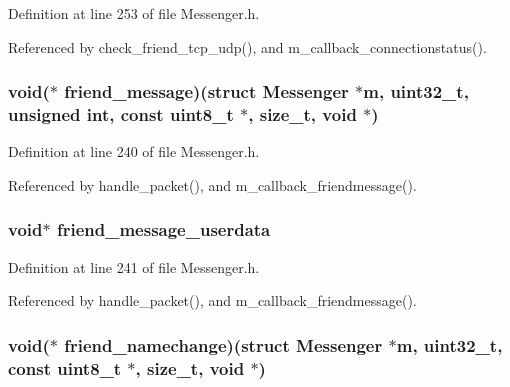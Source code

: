 Definition at line 253 of file Messenger.\+h.



Referenced by check\+\_\+friend\+\_\+tcp\+\_\+udp(), and m\+\_\+callback\+\_\+connectionstatus().

\hypertarget{struct_messenger_a85d35646398022de4e435174f990ce18}{
\subsubsection[{friend\+\_\+message}]{\setlength{\rightskip}{0pt plus 5cm}void($\ast$ friend\+\_\+message)(struct {\bf Messenger} $\ast${\bf m}, uint32\+\_\+t, unsigned int, const uint8\+\_\+t $\ast$, size\+\_\+t, void $\ast$)}}\label{struct_messenger_a85d35646398022de4e435174f990ce18}


Definition at line 240 of file Messenger.\+h.



Referenced by handle\+\_\+packet(), and m\+\_\+callback\+\_\+friendmessage().

\hypertarget{struct_messenger_a2b0701803305a0b99a2d3f016300b900}{
\subsubsection[{friend\+\_\+message\+\_\+userdata}]{\setlength{\rightskip}{0pt plus 5cm}void$\ast$ friend\+\_\+message\+\_\+userdata}}\label{struct_messenger_a2b0701803305a0b99a2d3f016300b900}


Definition at line 241 of file Messenger.\+h.



Referenced by handle\+\_\+packet(), and m\+\_\+callback\+\_\+friendmessage().

\hypertarget{struct_messenger_a108f796a6b45966363b7bd8a64f366f8}{
\subsubsection[{friend\+\_\+namechange}]{\setlength{\rightskip}{0pt plus 5cm}void($\ast$ friend\+\_\+namechange)(struct {\bf Messenger} $\ast${\bf m}, uint32\+\_\+t, const uint8\+\_\+t $\ast$, size\+\_\+t, void $\ast$)}}\label{struct_messenger_a108f796a6b45966363b7bd8a64f366f8}


